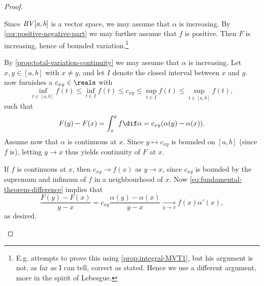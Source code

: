 \documentclass[article, a4paper, 11pt, oneside]{memoir}
\numberwithin{equation}{chapter}
\begin{document}
\begin{proof}
\begin{proofsec}
    \item[Proof of \subcref{enum:integral-is-BV}]
    Since $\mathit{BV}[a,b]$ is a vector space, we may assume that $\alpha$ is increasing. By \cref{cor:positive-negative-part} we may further assume that $f$ is positive. Then $F$ is increasing, hence of bounded variation.\footnote{E.g. \textcite[Theorem~7.32]{apostolanalysis} attempts to prove this using \cref{prop:integral-MVT1}, but his argument is not, as far as I can tell, correct as stated. Hence we use a different argument, more in the spirit of Lebesgue.}
    
    \item[Proof of \subcref{enum:continuity-of-integral}]
    By \cref{prop:total-variation-continuity} we may assume that $\alpha$ is increasing. Let $x,y \in [a,b]$ with $x \neq y$, and let $I$ denote the closed interval between $x$ and $y$.  now furnishes a $c_{xy} \in \reals$ with
    \begin{equation*}
        \inf_{t \in [a,b]} f(t)
            \leq \inf_{t \in I} f(t)
            \leq c_{xy}
            \leq \sup_{t \in I} f(t)
            \leq \sup_{t \in [a,b]} f(t),
    \end{equation*}
    such that
    \begin{equation}
        \label{eq:fundamental-theorem-difference}
        F(y) - F(x)
            = \int_x^y f \dif\alpha
            = c_{xy} (\alpha(y) - \alpha(x)).
    \end{equation}
    Assume now that $\alpha$ is continuous at $x$. Since $y \mapsto c_{xy}$ is bounded on $[a,b]$ (since $f$ is), letting $y \to x$ thus yields continuity of $F$ at $x$.

    \item[Proof of \subcref{enum:first-fundamental-theorem-of-calculus}]
    If $f$ is continuous at $x$, then $c_{xy} \to f(x)$ as $y \to x$, since $c_{xy}$ is bounded by the supremum and infimum of $f$ in a neighbourhood of $x$. Now \cref{eq:fundamental-theorem-difference} implies that
    \begin{equation*}
        \frac{F(y) - F(x)}{y-x}
            = c_{xy} \frac{\alpha(y) - \alpha(x)}{y-x}
            \xrightarrow[y \to x]{}
            f(x) \alpha'(x),
    \end{equation*}
    as desired.
\end{proofsec}
\end{proof}
\end{document}
